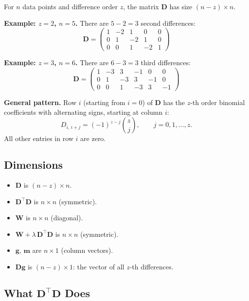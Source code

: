 \documentclass[11pt,a4paper]{article}
\begin{document}
\begin{formaldef}
For $n$ data points and difference order $z$, the matrix $\bm{D}$ has size $(n-z) \times n$.

\textbf{Example: $z=2$, $n=5$.}  There are $5-2=3$ second differences:
\[
\bm{D} = \begin{pmatrix}
1 & -2 & 1 & 0 & 0 \\
0 & 1 & -2 & 1 & 0 \\
0 & 0 & 1 & -2 & 1
\end{pmatrix}
\]

\textbf{Example: $z=3$, $n=6$.}  There are $6-3=3$ third differences:
\[
\bm{D} = \begin{pmatrix}
1 & -3 & 3 & -1 & 0 & 0 \\
0 & 1 & -3 & 3 & -1 & 0 \\
0 & 0 & 1 & -3 & 3 & -1
\end{pmatrix}
\]

\textbf{General pattern.}  Row $i$ (starting from $i=0$) of $\bm{D}$ has the $z$-th order binomial coefficients with alternating signs, starting at column $i$:
\[
  D_{i,\,i+j} = (-1)^{z-j}\binom{z}{j}, \qquad j = 0, 1, \ldots, z.
\]
All other entries in row $i$ are zero.
\end{formaldef}

\subsection{Dimensions}

\begin{dimcheck}
\begin{itemize}[nosep]
  \item $\bm{D}$ is $(n-z) \times n$.
  \item $\bm{D}^\top \bm{D}$ is $n \times n$ (symmetric).
  \item $\bm{W}$ is $n \times n$ (diagonal).
  \item $\bm{W} + \lambda\,\bm{D}^\top\bm{D}$ is $n \times n$ (symmetric).
  \item $\bm{g}$, $\bm{m}$ are $n \times 1$ (column vectors).
  \item $\bm{D}\bm{g}$ is $(n-z) \times 1$: the vector of all $z$-th differences.
\end{itemize}
\end{dimcheck}

\subsection{What $\bm{D}^\top\bm{D}$ Does}
\end{document}
